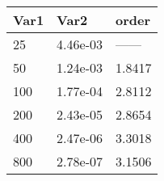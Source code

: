 \begin{tabular}{lll}
Var1 & Var2 & order \\ 
\hline 
25 & 4.46e-03 & ------ \\ 
50 & 1.24e-03 & 1.8417 \\ 
100 & 1.77e-04 & 2.8112 \\ 
200 & 2.43e-05 & 2.8654 \\ 
400 & 2.47e-06 & 3.3018 \\ 
800 & 2.78e-07 & 3.1506 \\ 
\hline 
\end{tabular}